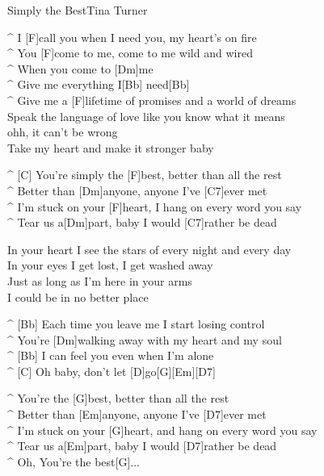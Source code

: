 \begin{song}{Simply the Best}{Tina Turner}

\begin{guitar}
^ I [F]call you when I need you, my heart's on fire \\
^ You [F]come to me, come to me wild and wired \\
^ When you come to [Dm]me \\
^ Give me everything I[Bb] need[Bb] \\
^ Give me a [F]lifetime of promises and a world of dreams \\
Speak the language of love like you know what it means \\
ohh, it can't be wrong \\
Take my heart and make it stronger baby \\
\end{guitar}

\begin{guitar}
^ [C] You're simply the [F]best, better than all the rest \\
^ Better than [Dm]anyone, anyone I've [C7]ever met \\
^ I'm stuck on your [F]heart, I hang on every word you say \\
^ Tear us a[Dm]part, baby I would [C7]rather be dead \\
\end{guitar}

\begin{guitar}
In your heart I see the stars of every night and every day \\
In your eyes I get lost, I get washed away \\
Just as long as I'm here in your arms \\
I could be in no better place \\
\end{guitar}


\begin{guitar}
^ [Bb] Each time you leave me I start losing control \\
^ You're [Dm]walking away with my heart and my soul \\
^ [Bb] I can feel you even when I'm alone \\
^ [C] Oh baby, don't let [D]go[G][Em][D7]\\
\end{guitar}

\begin{guitar}
^ You're the [G]best, better than all the rest \\
^ Better than [Em]anyone, anyone I've [D7]ever met \\
^ I'm stuck on your [G]heart, and hang on every word you say \\
^ Tear us a[Em]part, baby I would [D7]rather be dead\\
^ Oh, You're the best[G]...\\
\end{guitar}
\end{song}
